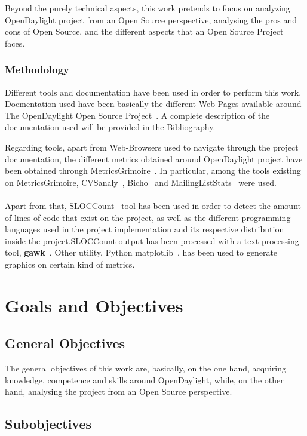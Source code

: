 \documentclass[a4paper, 12pt]{book}
\begin{document}
Beyond the purely technical aspects, this work pretends to focus on analyzing OpenDaylight project from an Open Source perspective, analysing the pros and cons of Open Source, and the different aspects that an Open Source Project faces.

\subsection{Methodology}
\label{subsec:methodology}
Different tools and documentation have been used in order to perform this work. Docmentation used have been basically the different Web Pages available around The OpenDaylight Open Source Project~\cite{OpenDaylight}. A complete description of the documentation used will be provided in the Bibliography.

Regarding tools, apart from Web-Browsers used to navigate through the project documentation, the different metrics obtained around OpenDaylight project have been obtained through MetricsGrimoire~\cite{MetricsGrimoire}. In particular, among the tools existing on MetricsGrimoire, CVSanaly~\cite{CVSanaly}, Bicho~\cite{Bicho} and MailingListStats~\cite{MailStats} were used.\\
\\
Apart from that, SLOCCount~\cite{SLOCCount} tool has been used in order to detect the amount of lines of code that exist on the project, as well as the different programming languages used in the project implementation and its respective distribution inside the project.SLOCCount output has been processed with a text processing tool, \textbf{gawk}~\cite{GAWK}. Other utility, Python matplotlib~\cite{PyMatplotlib}, has been used to generate graphics on certain kind of metrics.

\chapter{Goals and Objectives}
\label{chap:Goals}
\section{General Objectives}
\label{sec:genobj}

The general objectives of this work are, basically, on the one hand, acquiring knowledge, competence and skills around OpenDaylight, while, on the other hand, analysing the project from an Open Source perspective.

\section{Subobjectives}
\label{sec:subobj}
\end{document}
